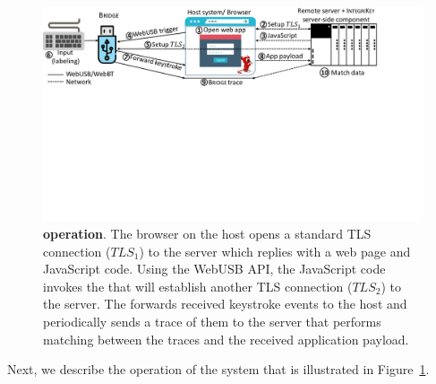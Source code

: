 %
%
\begin{figure}[t]
 \centering
  \includegraphics[trim={0 11cm 4cm 0},clip,width=0.95\linewidth]{chapters/IntegriKey/images/SystemDesign_forms_revised_5.pdf}
 \caption[\name operation]{\textbf{\name operation}. The browser on the host opens a standard TLS connection ($TLS_1$) to the server which replies with a web page and JavaScript code. Using the WebUSB API, the JavaScript code invokes the \device that will establish another TLS connection ($TLS_2$) to the server. The \device forwards received keystroke events to the host and periodically sends a trace of them to the server that performs matching between the traces and the received application payload.}
 \label{fig:systemDesignForms}
\end{figure}

Next, we describe the operation of the \name system that is illustrated in Figure~\ref{fig:systemDesignForms}. 

